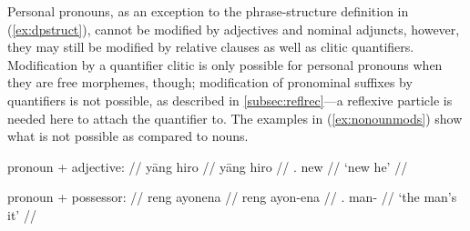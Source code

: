 \begin{morphlex}
\ex\label{ex:perspromorphlex}
\xe
\end{morphlex}

Personal pronouns, as an exception to the phrase-structure definition in 
(\ref{ex:dpstruct}), cannot be modified by adjectives and nominal adjuncts,
however, they may still be modified by relative clauses as well as clitic
quantifiers. Modification by a quantifier clitic is only possible for personal
pronouns when they are free morphemes, though; modification of pronominal
suffixes by quantifiers is not possible, as described in
\autoref{subsec:reflrec}---a reflexive particle is needed here to attach the
quantifier to. The examples in (\ref{ex:nonounmods}) show what is not possible
as compared to nouns.

\pex\label{ex:nonounmods}
\a\ljudge* %
	\begin{minipage}[t]{.5\linewidth}
	\begingl
		\glpreamble pronoun + adjective: //
		\gla yāng hiro //
		\glb yāng hiro //
		\glc \TsgM{}.\Aarg{} new //
		\glft `new he' //
	\endgl
	\end{minipage}

\a\ljudge* %
	\begin{minipage}[t]{.5\linewidth}
	\begingl
		\glpreamble pronoun + possessor: //
		\gla reng ayonena //
		\glb reng ayon-ena //
		\glc \TsgI{}.\Aarg{} man-\Gen{} //
		\glft `the man's it' //
	\endgl
	\end{minipage}


